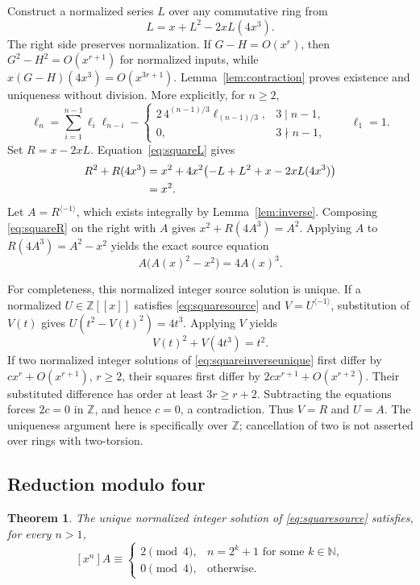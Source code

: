 \documentclass[11pt,a4paper]{article}
\newtheorem{theorem}{Theorem}[section]
\theoremstyle{remark}
\newcommand{\Z}{\mathbb Z}
\newcommand{\N}{\mathbb N}
\newcommand{\ps}[1]{#1[[x]]}
\newcommand{\rev}{^{\langle-1\rangle}}
\begin{document}
Construct a normalized series $L$ over any commutative ring from
\begin{equation}\label{eq:squareL}
 L=x+L^2-2xL(4x^3).
\end{equation}
The right side preserves normalization. If $G-H=O(x^r)$, then
$G^2-H^2=O(x^{r+1})$ for normalized inputs, while
$x(G-H)(4x^3)=O(x^{3r+1})$. Lemma~\ref{lem:contraction} proves
existence and uniqueness without division. More explicitly, for $n\ge2$,
\[
 \ell_n=\sum_{i=1}^{n-1}\ell_i\ell_{n-i}
 -\begin{cases}
  2\,4^{(n-1)/3}\ell_{(n-1)/3},&3\mid n-1,\\
  0,&3\nmid n-1,
 \end{cases}
 \qquad \ell_1=1.
\]
Set $R=x-2xL$. Equation~\eqref{eq:squareL} gives
\begin{align}
 R^2+R(4x^3)
 &=x^2+4x^2\bigl(-L+L^2+x-2xL(4x^3)\bigr)\notag\\
 &=x^2.\label{eq:squareR}
\end{align}
Let $A=R\rev$, which exists integrally by Lemma~\ref{lem:inverse}.
Composing \eqref{eq:squareR} on the right with $A$ gives
$x^2+R(4A^3)=A^2$. Applying $A$ to $R(4A^3)=A^2-x^2$ yields
the exact source equation
\begin{equation}\label{eq:squaresource}
 A\bigl(A(x)^2-x^2\bigr)=4A(x)^3.
\end{equation}

For completeness, this normalized integer source solution is unique.
If a normalized $U\in\ps{\Z}$ satisfies \eqref{eq:squaresource} and
$V=U\rev$, substitution of $V(t)$ gives
$U(t^2-V(t)^2)=4t^3$. Applying $V$ yields
\begin{equation}\label{eq:squareinverseunique}
 V(t)^2+V(4t^3)=t^2.
\end{equation}
If two normalized integer solutions of \eqref{eq:squareinverseunique}
first differ by $c x^r+O(x^{r+1})$, $r\ge2$, their squares first differ
by $2c x^{r+1}+O(x^{r+2})$. Their substituted difference has order at
least $3r\ge r+2$. Subtracting the equations forces $2c=0$ in $\Z$,
and hence $c=0$, a contradiction. Thus $V=R$ and $U=A$.
The uniqueness argument here is specifically over $\Z$; cancellation of
two is not asserted over rings with two-torsion.

\subsection{Reduction modulo four}

\begin{theorem}\label{thm:squareresidue}
The unique normalized integer solution of \eqref{eq:squaresource} satisfies,
for every $n>1$,
\[
 [x^n]A\equiv
 \begin{cases}
  2\pmod4,&n=2^k+1\text{ for some }k\in\N,\\
  0\pmod4,&\text{otherwise}.
 \end{cases}
\]
\end{theorem}
\end{document}
